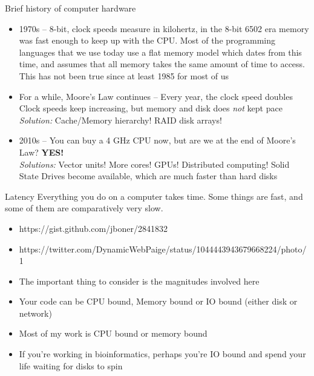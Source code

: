 \documentclass{beamer}
\begin{document}
\begin{frame}{Brief history of computer hardware}
	\begin{itemize}
 \item 1970s -- 8-bit, clock speeds measure in kilohertz, in the 8-bit 6502 era memory was fast enough to keep up with the CPU. Most of the programming languages that we use today use a flat memory model which dates from this time, and assumes that all memory takes the same amount of time to access. This has not been true since at least 1985 for most of us
\item For a while, Moore's Law continues -- Every year, the clock speed doubles \\
	Clock speeds keep increasing, but memory and disk does \emph{not} kept pace \\
	\emph{Solution:} Cache/Memory hierarchy! RAID disk arrays!

\item	2010s -- You can buy a 4 GHz CPU now, but are we at the end of Moore's Law? \textbf{YES!}\\
	\emph{Solutions:} Vector units! More cores! GPUs! Distributed computing! Solid State Drives become available, which are much faster than hard disks
	\end{itemize}
\end{frame}

\begin{frame}{Latency}
	Everything you do on a computer takes time. Some things are fast, and some of them are
	comparatively very slow.
	\begin{itemize}
		\item https://gist.github.com/jboner/2841832
		\item https://twitter.com/DynamicWebPaige/status/1044443943679668224/photo/1
		\item The important thing to consider is the magnitudes involved here
\item Your code can be CPU bound, Memory bound or IO bound (either disk or network)
\item Most of my work is CPU bound or memory bound
\item If you're working in
	bioinformatics, perhaps you're IO bound and spend your life waiting for
	disks to spin
	\end{itemize}
\end{frame}
\end{document}
